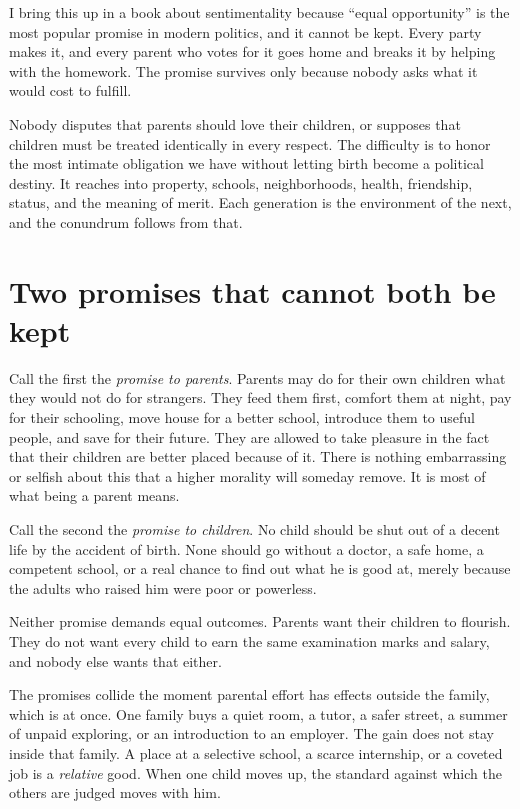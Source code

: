 \documentclass[12pt,a4paper]{book}
\begin{document}
I bring this up in a book about sentimentality because ``equal opportunity'' is the most popular promise in modern politics, and it cannot be kept. Every party makes it, and every parent who votes for it goes home and breaks it by helping with the homework. The promise survives only because nobody asks what it would cost to fulfill.

Nobody disputes that parents should love their children, or supposes that children must be treated identically in every respect. The difficulty is to honor the most intimate obligation we have without letting birth become a political destiny. It reaches into property, schools, neighborhoods, health, friendship, status, and the meaning of merit. Each generation is the environment of the next, and the conundrum follows from that.

\section{Two promises that cannot both be kept}

Call the first the \emph{promise to parents}. Parents may do for their own children what they would not do for strangers. They feed them first, comfort them at night, pay for their schooling, move house for a better school, introduce them to useful people, and save for their future. They are allowed to take pleasure in the fact that their children are better placed because of it. There is nothing embarrassing or selfish about this that a higher morality will someday remove. It is most of what being a parent means.

Call the second the \emph{promise to children}. No child should be shut out of a decent life by the accident of birth. None should go without a doctor, a safe home, a competent school, or a real chance to find out what he is good at, merely because the adults who raised him were poor or powerless.

Neither promise demands equal outcomes. Parents want their children to flourish. They do not want every child to earn the same examination marks and salary, and nobody else wants that either.

The promises collide the moment parental effort has effects outside the family, which is at once. One family buys a quiet room, a tutor, a safer street, a summer of unpaid exploring, or an introduction to an employer. The gain does not stay inside that family. A place at a selective school, a scarce internship, or a coveted job is a \emph{relative} good. When one child moves up, the standard against which the others are judged moves with him.
\end{document}
